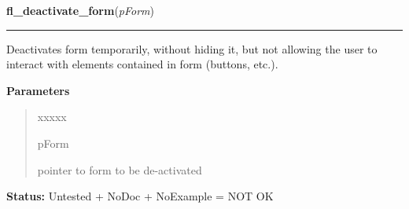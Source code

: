 \hspace{.8\funcindent}\begin{boxedminipage}{\funcwidth}

    \raggedright \textbf{fl\_deactivate\_form}(\textit{pForm})

    \vspace{-1.5ex}

    \rule{\textwidth}{0.5\fboxrule}
\setlength{\parskip}{2ex}
    Deactivates form temporarily, without hiding it, but not allowing the 
    user to interact with elements contained in form (buttons, etc.).

\setlength{\parskip}{1ex}
      \textbf{Parameters}
      \vspace{-1ex}

      \begin{quote}
        \begin{Ventry}{xxxxx}

          \item[pForm]

          pointer to form to be de-activated

        \end{Ventry}

      \end{quote}

\textbf{Status:} Untested + NoDoc + NoExample = NOT OK



    \end{boxedminipage}

    \label{xformslib:library:fl_activate_form}

    \vspace{0.5ex}

